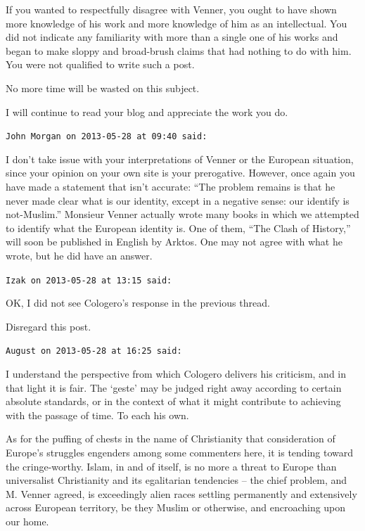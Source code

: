 \begin{footnotesize}
\begin{sffamily}
If you wanted to respectfully disagree with Venner, you ought to have shown more knowledge of his work and more knowledge of him as an intellectual. You did not indicate any familiarity with more than a single one of his works and began to make sloppy and broad-brush claims that had nothing to do with him. You were not qualified to write such a post.

No more time will be wasted on this subject.

I will continue to read your blog and appreciate the work you do.

\hfill

\texttt{John Morgan on 2013-05-28 at 09:40 said:}

I don't take issue with your interpretations of Venner or the European situation, since your opinion on your own site is your prerogative. However, once again you have made a statement that isn't accurate: ``The problem remains is that he never made clear what is our identity, except in a negative sense: our identify is not-Muslim.'' Monsieur Venner actually wrote many books in which we attempted to identify what the European identity is. One of them, ``The Clash of History,'' will soon be published in English by Arktos. One may not agree with what he wrote, but he did have an answer.

\hfill

\texttt{Izak on 2013-05-28 at 13:15 said:}

OK, I did not see Cologero's response in the previous thread.

Disregard this post.

\hfill

\texttt{August on 2013-05-28 at 16:25 said:}

I understand the perspective from which Cologero delivers his criticism, and in that light it is fair. The `geste' may be judged right away according to certain absolute standards, or in the context of what it might contribute to achieving with the passage of time. To each his own.

As for the puffing of chests in the name of Christianity that consideration of Europe's struggles engenders among some commenters here, it is tending toward the cringe-worthy. Islam, in and of itself, is no more a threat to Europe than universalist Christianity and its egalitarian tendencies -- the chief problem, and M. Venner agreed, is exceedingly alien races settling permanently and extensively across European territory, be they Muslim or otherwise, and encroaching upon our home.


\end{sffamily}
\end{footnotesize}
